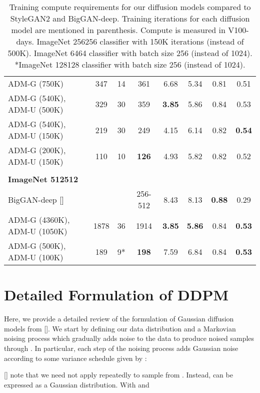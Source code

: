 \documentclass{article}
\newcommand{\shortcite}[1]{[\citenum{#1}]}
\newcommand{\namecite}[1]{\citeauthor{#1} [\citenum{#1}]}
\begin{document}
\begin{table}[h]
\begin{center}
\begin{small}
\begin{tabular}{lccccccc}
    ADM-G (750K)                    & 347 & 14 & 361      & 6.68      & 5.34      & 0.81     & 0.51 \\
    ADM-G (540K), ADM-U (500K)      & 329 & 30 & 359      & \bf{3.85} & 5.86      & 0.84     & 0.53 \\
    ADM-G (540K), ADM-U (150K)      & 219 & 30 & 249      & 4.15      & 6.14      & 0.82	 & \bf{0.54} \\
    ADM-G (200K), ADM-U (150K)      & 110 & 10 & \bf{126} & 4.93      & 5.82      & 0.82     & 0.52  \\
    \\
    \multicolumn{6}{l}{\bf{ImageNet} 512512} \\
    \toprule
    BigGAN-deep \shortcite{biggan}  & &    & 256-512 & 8.43      & 8.13      & \bf{0.88} & 0.29 \\
    ADM-G (4360K), ADM-U (1050K)   & 1878 & 36 & 1914 & \bf{3.85} & \bf{5.86} & 0.84      & \bf{0.53} \\
    ADM-G (500K), ADM-U (100K) & 189 & 9* & \bf{198} & 7.59 & 6.84 & 0.84 & \bf{0.53}  \\
    \bottomrule
    \end{tabular}
    \end{small}
    \end{center}
    \caption{Training compute requirements for our diffusion models compared to StyleGAN2 and BigGAN-deep. Training iterations for each diffusion model are mentioned in parenthesis. Compute is measured in V100-days. ImageNet 256256 classifier with 150K iterations (instead of 500K). ImageNet 6464 classifier with batch size 256 (instead of 1024). *ImageNet 128128 classifier with batch size 256 (instead of 1024).}
    \label{tab:computecomparison}
    \vskip -0.2in
\end{table}
\clearpage
\section{Detailed Formulation of DDPM}
\label{app:detailedbackground}
Here, we provide a detailed review of the formulation of Gaussian diffusion models from \namecite{ddpm}. We start by defining our data distribution  and a Markovian noising process  which gradually adds noise to the data to produce noised samples  through . In particular, each step of the noising process adds Gaussian noise according to some variance schedule given by :


\namecite{ddpm} note that we need not apply  repeatedly to sample from . Instead,  can be expressed as a Gaussian distribution. With  and 
\end{document}
